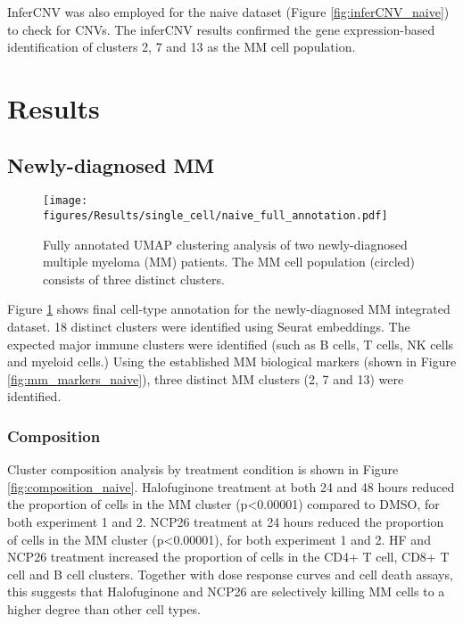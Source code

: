 InferCNV was also employed for the naive dataset (Figure \ref{fig:inferCNV_naive}) to check for CNVs.
The inferCNV results confirmed the gene expression-based identification of clusters 2, 7 and 13 as the MM cell population.

\clearpage
\section{Results}

\subsection{Newly-diagnosed MM}


\begin{figure}[hpt]
\centering
\texttt{[image: figures/Results/single\_cell/naive\_full\_annotation.pdf]}
\caption[Newly-diagnosed MM scRNA-seq full annotation]{Fully annotated UMAP clustering analysis of two newly-diagnosed multiple myeloma (MM) patients.
The MM cell population (circled) consists of three distinct clusters.}
\label{fig:full_anno_naive}
\end{figure}

Figure \ref{fig:full_anno_naive} shows final cell-type annotation for the newly-diagnosed MM integrated dataset.
18 distinct clusters were identified using Seurat embeddings.
The expected major immune clusters were identified (such as B cells, T cells, NK cells and myeloid cells.)
Using the established MM biological markers (shown in Figure \ref{fig:mm_markers_naive}), three distinct MM clusters (2, 7 and 13) were identified.

\subsubsection{Composition}
Cluster composition analysis by treatment condition is shown in Figure \ref{fig:composition_naive}.
Halofuginone treatment at both 24 and 48 hours reduced the proportion of cells in the MM cluster (p<0.00001) compared to DMSO, for both experiment 1 and 2.
NCP26 treatment at 24 hours reduced the proportion of cells in the MM cluster (p<0.00001), for both experiment 1 and 2.
HF and NCP26 treatment increased the proportion of cells in the CD4+ T cell, CD8+ T cell and B cell clusters.
Together with dose response curves and cell death assays, this suggests that Halofuginone and NCP26 are selectively killing MM cells to a higher degree than other cell types.

